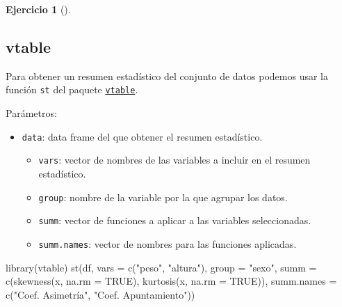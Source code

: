 \documentclass[
  spanish,
  a4paper,
]{scrreport}
\newenvironment{Shaded}{\begin{snugshade}}{\end{snugshade}}
\newcommand{\AttributeTok}[1]{\textcolor[rgb]{0.40,0.45,0.13}{#1}}
\newcommand{\FunctionTok}[1]{\textcolor[rgb]{0.28,0.35,0.67}{#1}}
\newcommand{\NormalTok}[1]{\textcolor[rgb]{0.00,0.23,0.31}{#1}}
\newcommand{\StringTok}[1]{\textcolor[rgb]{0.13,0.47,0.30}{#1}}
\providecommand{\tightlist}{%
  \setlength{\itemsep}{0pt}\setlength{\parskip}{0pt}}
\theoremstyle{definition}
\newtheorem{exercise}{Ejercicio}[chapter]
\theoremstyle{remark}
\begin{document}
\begin{exercise}[]
\begin{enumerate}
  \begin{tcolorbox}[enhanced jigsaw, colback=white, coltitle=black, toprule=.15mm, rightrule=.15mm, opacitybacktitle=0.6, opacityback=0, bottomtitle=1mm, toptitle=1mm, titlerule=0mm, breakable, leftrule=.75mm, title=\textcolor{quarto-callout-tip-color}{\faLightbulb}\hspace{0.5em}{Solución}, arc=.35mm, left=2mm, bottomrule=.15mm, colframe=quarto-callout-tip-color-frame, colbacktitle=quarto-callout-tip-color!10!white]

  \section{vtable}

  Para obtener un resumen estadístico del conjunto de datos podemos usar
  la función \texttt{st} del paquete
  \href{https://cran.r-project.org/web/packages/vtable/vignettes/sumtable.html}{\texttt{vtable}}.

  Parámetros:

  \begin{itemize}
  \tightlist
  \item
    \texttt{data}: data frame del que obtener el resumen estadístico.

    \begin{itemize}
    \tightlist
    \item
      \texttt{vars}: vector de nombres de las variables a incluir en el
      resumen estadístico.
    \item
      \texttt{group}: nombre de la variable por la que agrupar los
      datos.
    \item
      \texttt{summ}: vector de funciones a aplicar a las variables
      seleccionadas.
    \item
      \texttt{summ.names}: vector de nombres para las funciones
      aplicadas.
    \end{itemize}
  \end{itemize}

\begin{Shaded}
\begin{Highlighting}[]
\FunctionTok{library}\NormalTok{(vtable)}
\FunctionTok{st}\NormalTok{(df, }\AttributeTok{vars =} \FunctionTok{c}\NormalTok{(}\StringTok{"peso"}\NormalTok{, }\StringTok{"altura"}\NormalTok{), }\AttributeTok{group =} \StringTok{"sexo"}\NormalTok{, }\AttributeTok{summ =} \FunctionTok{c}\NormalTok{(}\StringTok{\textquotesingle{}skewness(x, na.rm = TRUE)\textquotesingle{}}\NormalTok{, }\StringTok{\textquotesingle{}kurtosis(x, na.rm = TRUE)\textquotesingle{}}\NormalTok{),}
\AttributeTok{summ.names =} \FunctionTok{c}\NormalTok{(}\StringTok{"Coef. Asimetría"}\NormalTok{, }\StringTok{"Coef. Apuntamiento"}\NormalTok{))}
\end{Highlighting}
\end{Shaded}


\end{tcolorbox}
\end{enumerate}
\end{exercise}
\end{document}
